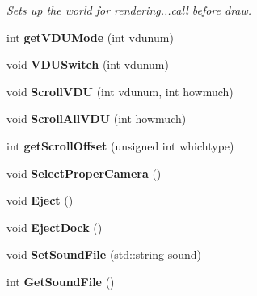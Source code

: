 \begin{DoxyCompactItemize}
\begin{DoxyCompactList}\small\item\em Sets up the world for rendering...call before draw. \end{DoxyCompactList}\item 
int {\bfseries get\+V\+D\+U\+Mode} (int vdunum)\hypertarget{classGameCockpit_ad40f186dcdfcf0e357fcd802ba432201}{}\label{classGameCockpit_ad40f186dcdfcf0e357fcd802ba432201}

\item 
void {\bfseries V\+D\+U\+Switch} (int vdunum)\hypertarget{classGameCockpit_a0edebaa11ecbd68fd27378e63f1d490c}{}\label{classGameCockpit_a0edebaa11ecbd68fd27378e63f1d490c}

\item 
void {\bfseries Scroll\+V\+DU} (int vdunum, int howmuch)\hypertarget{classGameCockpit_aa1aa002e5af2846d47da67135a815726}{}\label{classGameCockpit_aa1aa002e5af2846d47da67135a815726}

\item 
void {\bfseries Scroll\+All\+V\+DU} (int howmuch)\hypertarget{classGameCockpit_a78cc3470f7ab32701776bd673f62f3a9}{}\label{classGameCockpit_a78cc3470f7ab32701776bd673f62f3a9}

\item 
int {\bfseries get\+Scroll\+Offset} (unsigned int whichtype)\hypertarget{classGameCockpit_a6e0e72960ec2cdfdbeaa579c8598ce02}{}\label{classGameCockpit_a6e0e72960ec2cdfdbeaa579c8598ce02}

\item 
void {\bfseries Select\+Proper\+Camera} ()\hypertarget{classGameCockpit_a21fcb386b15f48ebf6d9a4652499e022}{}\label{classGameCockpit_a21fcb386b15f48ebf6d9a4652499e022}

\item 
void {\bfseries Eject} ()\hypertarget{classGameCockpit_a5245cf28d392efd2f8218a1dab149d40}{}\label{classGameCockpit_a5245cf28d392efd2f8218a1dab149d40}

\item 
void {\bfseries Eject\+Dock} ()\hypertarget{classGameCockpit_a6288e1d5dac45a306541afb0675deb89}{}\label{classGameCockpit_a6288e1d5dac45a306541afb0675deb89}

\item 
void {\bfseries Set\+Sound\+File} (std\+::string sound)\hypertarget{classGameCockpit_a2a4543d2fe241ae5928f2b7f4db91864}{}\label{classGameCockpit_a2a4543d2fe241ae5928f2b7f4db91864}

\item 
int {\bfseries Get\+Sound\+File} ()\hypertarget{classGameCockpit_a348f6ede9c8e7c356b15d4effc02c001}{}\label{classGameCockpit_a348f6ede9c8e7c356b15d4effc02c001}


\end{DoxyCompactItemize}
